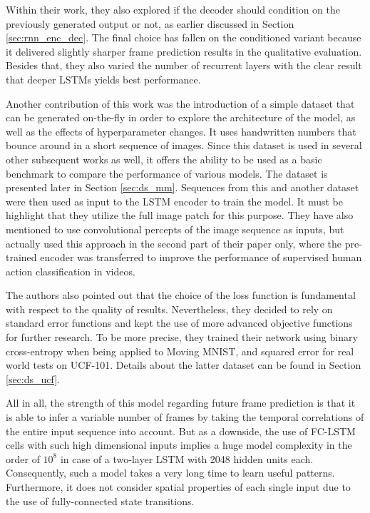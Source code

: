 Within their work, they also explored if the decoder should condition on the previously generated output or not, as earlier discussed in Section \ref{sec:rnn_enc_dec}. The final choice has fallen on the conditioned variant because it delivered slightly sharper frame prediction results in the qualitative evaluation. Besides that, they also varied the number of recurrent layers with the clear result that deeper LSTMs yields best performance.

Another contribution of this work was the introduction of a simple dataset that can be generated on-the-fly in order to explore the architecture of the model, as well as the effects of hyperparameter changes. It uses handwritten numbers that bounce around in a short sequence of images. Since this dataset is used in several other subsequent works as well, it offers the ability to be used as a basic benchmark to compare the performance of various models. The dataset is presented later in Section \ref{sec:ds_mm}. Sequences from this and another dataset were then used as input to the LSTM encoder to train the model. It must be highlight that they utilize the full image patch for this purpose. They have also mentioned to use convolutional percepts of the image sequence as inputs, but actually used this approach in the second part of their paper only, where the pre-trained encoder was transferred to improve the performance of supervised human action classification in videos.

The authors also pointed out that the choice of the loss function is fundamental with respect to the quality of results. Nevertheless, they decided to rely on standard error functions and kept the use of more advanced objective functions for further research. To be more precise, they trained their network using binary cross-entropy when being applied to Moving MNIST, and squared error for real world tests on UCF-101. Details about the latter dataset can be found in Section \ref{sec:ds_ucf}.

All in all, the strength of this model regarding future frame prediction is that it is able to infer a variable number of frames by taking the temporal correlations of the entire input sequence into account. But as a downside, the use of FC-LSTM cells with such high dimensional inputs implies a huge model complexity in the order of $10^8$ in case of a two-layer LSTM with \num{2048} hidden units each. Consequently, such a model takes a very long time to learn useful patterns. Furthermore, it does not consider spatial properties of each single input due to the use of fully-connected state transitions.


